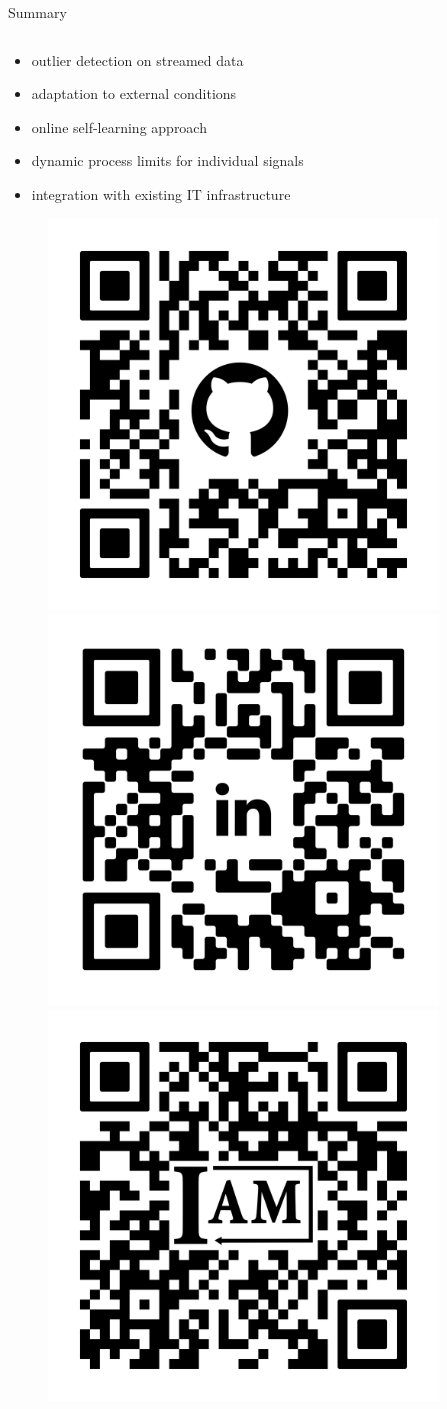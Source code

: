 \documentclass[aspectratio=169]{beamer}
\begin{document}
\begin{frame}{Summary}
    \renewcommand{\figurename}{}
    \begin{columns}
        \begin{column}{0.65\linewidth}
            \begin{itemize}
                \item outlier detection on streamed data
                \item adaptation to external conditions
                \item online self-learning approach
                \item dynamic process limits for individual signals
                \item integration with existing IT infrastructure
            \end{itemize}
            \begin{figure}[htpb]
                \begin{center}
                    \includegraphics[width=0.2\linewidth]{figures/qr_pc2023_squares.pdf}\hfil
                    \includegraphics[width=0.2\linewidth]{figures/qr_in_squares_logo.pdf}\hfil
                    \includegraphics[width=0.2\linewidth]{figures/qr_uiam_squares_logo.pdf}
                \end{center}
            \end{figure}
        \end{column}
        \begin{column}{0.35\linewidth}
            \begin{figure}[htpb]
                \begin{center}

\end{center}
\end{figure}
\end{column}
\end{columns}
\end{frame}
\end{document}
